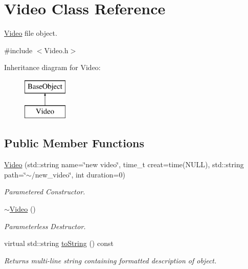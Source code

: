 \hypertarget{classVideo}{\section{Video Class Reference}
\label{classVideo}
}


\hyperlink{classVideo}{Video} file object.  




{\ttfamily \#include $<$Video.\-h$>$}

Inheritance diagram for Video\-:\begin{figure}[H]
\begin{center}
\leavevmode
\includegraphics[height=2.000000cm]{classVideo}
\end{center}
\end{figure}
\subsection*{Public Member Functions}
\begin{DoxyCompactItemize}
\item 
\hypertarget{classVideo_ad0277d8e5772008e22ac2948e03e103b}{\hyperlink{classVideo_ad0277d8e5772008e22ac2948e03e103b}{Video} (std\-::string name=\char`\"{}new video\char`\"{}, time\-\_\-t creat=time(N\-U\-L\-L), std\-::string path=\char`\"{}$\sim$/new\-\_\-video\char`\"{}, int duration=0)}\label{classVideo_ad0277d8e5772008e22ac2948e03e103b}

\begin{DoxyCompactList}\small\item\em Parametered Constructor. \end{DoxyCompactList}\item 
\hyperlink{classVideo_aebf7e2a8fa2bbd79335b1cf35925d190}{$\sim$\-Video} ()
\begin{DoxyCompactList}\small\item\em Parameterless Destructor. \end{DoxyCompactList}\item 
\hypertarget{classVideo_ad947c70ddc192dcb8e511fda6a616a4f}{virtual std\-::string \hyperlink{classVideo_ad947c70ddc192dcb8e511fda6a616a4f}{to\-String} () const }\label{classVideo_ad947c70ddc192dcb8e511fda6a616a4f}

\begin{DoxyCompactList}\small\item\em Returns multi-\/line string containing formatted description of object. \end{DoxyCompactList}\end{DoxyCompactItemize}


